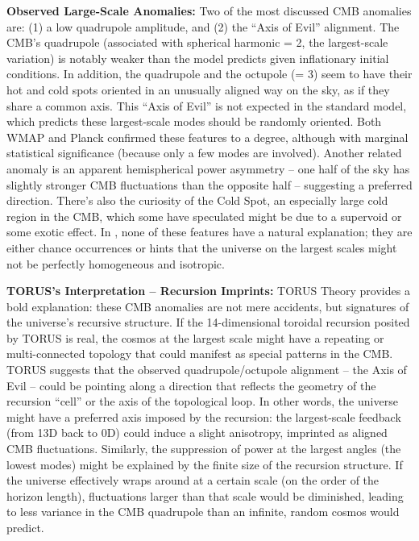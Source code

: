 \documentclass[
]{article}
\begin{document}
\textbf{Observed Large-Scale Anomalies:} Two of the most discussed CMB
anomalies are: (1) a low quadrupole amplitude, and (2) the ``Axis of
Evil'' alignment. The CMB's quadrupole (associated with spherical
harmonic \ell = 2, the largest-scale variation) is notably weaker than the
\LambdaCDM model predicts given inflationary initial conditions. In addition,
the quadrupole and the octupole (\ell = 3) seem to have their hot and cold
spots oriented in an unusually aligned way on the sky, as if they share
a common axis. This ``Axis of Evil'' is not expected in the standard
model, which predicts these largest-scale modes should be randomly
oriented. Both WMAP and Planck confirmed these features to a degree,
although with marginal statistical significance (because only a few
modes are involved). Another related anomaly is an apparent
hemispherical power asymmetry -- one half of the sky has slightly
stronger CMB fluctuations than the opposite half -- suggesting a
preferred direction. There's also the curiosity of the Cold Spot, an
especially large cold region in the CMB, which some have speculated
might be due to a supervoid or some exotic effect. In \LambdaCDM, none of
these features have a natural explanation; they are either chance
occurrences or hints that the universe on the largest scales might not
be perfectly homogeneous and isotropic.

\textbf{TORUS's Interpretation -- Recursion Imprints:} TORUS Theory
provides a bold explanation: these CMB anomalies are not mere accidents,
but signatures of the universe's recursive structure. If the
14-dimensional toroidal recursion posited by TORUS is real, the cosmos
at the largest scale might have a repeating or multi-connected topology
that could manifest as special patterns in the CMB. TORUS suggests that
the observed quadrupole/octupole alignment -- the Axis of Evil -- could
be pointing along a direction that reflects the geometry of the
recursion ``cell'' or the axis of the topological loop. In other words,
the universe might have a preferred axis imposed by the recursion: the
largest-scale feedback (from 13D back to 0D) could induce a slight
anisotropy, imprinted as aligned CMB fluctuations. Similarly, the
suppression of power at the largest angles (the lowest \ell modes) might be
explained by the finite size of the recursion structure. If the universe
effectively wraps around at a certain scale (on the order of the horizon
length), fluctuations larger than that scale would be diminished,
leading to less variance in the CMB quadrupole than an infinite, random
cosmos would predict.
\end{document}
